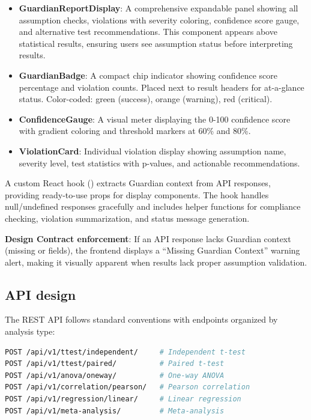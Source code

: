 \documentclass[article]{jss}
\begin{document}
\begin{itemize}
\item \textbf{GuardianReportDisplay}: A comprehensive expandable panel showing all assumption checks, violations with severity coloring, confidence score gauge, and alternative test recommendations. This component appears above statistical results, ensuring users see assumption status before interpreting results.

\item \textbf{GuardianBadge}: A compact chip indicator showing confidence score percentage and violation counts. Placed next to result headers for at-a-glance status. Color-coded: green (success), orange (warning), red (critical).

\item \textbf{ConfidenceGauge}: A visual meter displaying the 0-100 confidence score with gradient coloring and threshold markers at 60\% and 80\%.

\item \textbf{ViolationCard}: Individual violation display showing assumption name, severity level, test statistics with p-values, and actionable recommendations.
\end{itemize}

A custom React hook () extracts Guardian context from API responses, providing ready-to-use props for display components. The hook handles null/undefined responses gracefully and includes helper functions for compliance checking, violation summarization, and status message generation.

\textbf{Design Contract enforcement}: If an API response lacks Guardian context (missing  or  fields), the frontend displays a ``Missing Guardian Context'' warning alert, making it visually apparent when results lack proper assumption validation.

\subsection{API design}

The REST API follows standard conventions with endpoints organized by analysis type:

\begin{lstlisting}[language=bash,caption={API endpoint structure}]
POST /api/v1/ttest/independent/     # Independent t-test
POST /api/v1/ttest/paired/          # Paired t-test
POST /api/v1/anova/oneway/          # One-way ANOVA
POST /api/v1/correlation/pearson/   # Pearson correlation
POST /api/v1/regression/linear/     # Linear regression
POST /api/v1/meta-analysis/         # Meta-analysis
\end{lstlisting}
\end{document}
